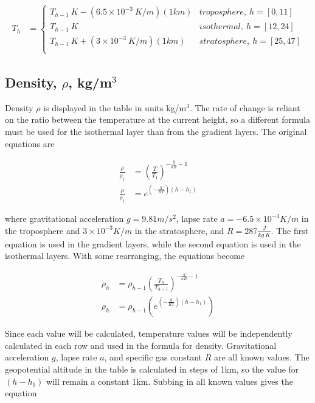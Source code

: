 \documentclass{article}
\begin{document}
\begin{align}
    T_h &= \begin{cases}
    T_{h-1}\ K - (6.5\times10^{-3}\  K/m)(1km)    & troposphere,\ h = [0,11] \\
    T_{h-1} \ K                                          & isothermal,\ h = [12,24] \\
    T_{h-1}\ K + (3\times10^{-3}\ K/m)(1km)       & stratosphere,\ h = [25,47] \\
    \end{cases}
\end{align}

\subsection{Density, $\rho$, kg/m$^3$}
Density $\rho$ is displayed in the table in units kg/m$^3$. The rate of change is reliant on the ratio between the temperature at the current height, so a different formula must be used for the isothermal layer than from the gradient layers. The original equations are 

\begin{align*}
    \frac{\rho}{\rho_1} &= {\left(\frac{T}{T_1}\right)}^{-\frac{g}{aR}-1} \\
    \frac{\rho}{\rho_1} &= e^{\left(- \frac{g}{RT}\right)\left(h-h_1\right)}
\end{align*}

where gravitational acceleration $g = 9.81m/s^2$, lapse rate $a= -6.5\times10^{-3} K/m$ in the troposphere and $3\times10^{-3}K/m$ in the stratosphere, and $R = 287 \frac{J}{kg\ K}$. The first equation is used in the gradient layers, while the second equation is used in the isothermal layers. With some rearranging, the equations become

\begin{align*}
    \rho_h &= \rho_{h-1}{\left(\frac{T_h}{T_{h-1}}\right)}^{-\frac{g}{aR}-1} \\
    \rho_h &= \rho_{h-1}\left(e^{\left(- \frac{g}{RT}\right)\left(h-h_1\right)}\right)
\end{align*}

Since each value will be calculated, temperature values will be independently calculated in each row and used in the formula for density. Gravitational acceleration $g$, lapse rate $a$, and specific gas constant $R$ are all known values. The geopotential altitude in the table is calculated in steps of 1km, so the value for $(h-h_1)$ will remain a constant 1km. Subbing in all known values gives the equation 
\end{document}
